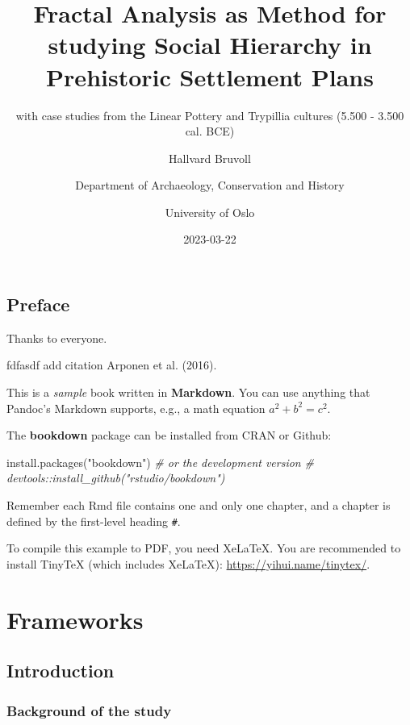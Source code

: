 \documentclass[
  12pt,
]{book}
\title{Fractal Analysis as Method for studying Social Hierarchy in Prehistoric Settlement Plans}
\subtitle{with case studies from the Linear Pottery and Trypillia cultures (5.500 - 3.500 cal. BCE)}
\author{Hallvard Bruvoll \and Department of Archaeology, Conservation and History \and University of Oslo}
\date{2023-03-22}
\newenvironment{Shaded}{\begin{snugshade}}{\end{snugshade}}
\newcommand{\CommentTok}[1]{\textcolor[rgb]{0.56,0.35,0.01}{\textit{#1}}}
\newcommand{\FunctionTok}[1]{\textcolor[rgb]{0.00,0.00,0.00}{#1}}
\newcommand{\NormalTok}[1]{#1}
\newcommand{\StringTok}[1]{\textcolor[rgb]{0.31,0.60,0.02}{#1}}
\begin{document}
\maketitle

{
\setcounter{tocdepth}{1}
\tableofcontents
}
\hypertarget{preface}{%
\chapter*{Preface}\label{preface}}

Thanks to everyone.

fdfasdf add citation Arponen et al. (2016).

This is a \emph{sample} book written in \textbf{Markdown}. You can use anything that Pandoc's Markdown supports, e.g., a math equation \(a^2 + b^2 = c^2\).

The \textbf{bookdown} package can be installed from CRAN or Github:

\begin{Shaded}
\begin{Highlighting}[]
\FunctionTok{install.packages}\NormalTok{(}\StringTok{"bookdown"}\NormalTok{)}
\CommentTok{\# or the development version}
\CommentTok{\# devtools::install\_github("rstudio/bookdown")}
\end{Highlighting}
\end{Shaded}

Remember each Rmd file contains one and only one chapter, and a chapter is defined by the first-level heading \texttt{\#}.

To compile this example to PDF, you need XeLaTeX. You are recommended to install TinyTeX (which includes XeLaTeX): \url{https://yihui.name/tinytex/}.

\hypertarget{part-frameworks}{%
\part{Frameworks}\label{part-frameworks}}

\hypertarget{introduction}{%
\chapter{Introduction}\label{introduction}}

\hypertarget{background-of-the-study}{%
\section{Background of the study}\label{background-of-the-study}}
\end{document}
